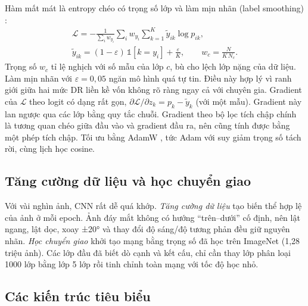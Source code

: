Hàm mất mát là entropy chéo có trọng số lớp và làm mịn nhãn (label smoothing) \cite{szegedy2016}:
\begin{equation}
\begin{gathered}
\mathcal L = -\frac{1}{\sum_i w_{y_i}}\sum_{i} w_{y_i}\sum_{k=1}^{K} \tilde y_{ik}\log p_{ik}, \\
\tilde y_{ik} = (1-\varepsilon)\,\mathbb 1[k=y_i] + \frac{\varepsilon}{K},\qquad w_c = \frac{N}{K\,N_c}.
\end{gathered}
\label{eq:ce}
\end{equation}
Trọng số $w_c$ tỉ lệ nghịch với số mẫu của lớp $c$, bù cho lệch lớp nặng của dữ liệu. Làm mịn nhãn với $\varepsilon=0{,}05$ ngăn mô hình quá tự tin. Điều này hợp lý vì ranh giới giữa hai mức DR liền kề vốn không rõ ràng ngay cả với chuyên gia. Gradient của $\mathcal L$ theo logit có dạng rất gọn, $\partial\mathcal L/\partial z_k = p_k - \tilde y_k$ (với một mẫu). Gradient này lan ngược qua các lớp bằng quy tắc chuỗi. Gradient theo bộ lọc tích chập chính là tương quan chéo giữa đầu vào và gradient đầu ra, nên cũng tính được bằng một phép tích chập. Tối ưu bằng AdamW \cite{loshchilov2019}, tức Adam với suy giảm trọng số tách rời, cùng lịch học cosine.

\subsection{Tăng cường dữ liệu và học chuyển giao}

Với vài nghìn ảnh, CNN rất dễ quá khớp. \emph{Tăng cường dữ liệu} tạo biến thể hợp lệ của ảnh ở mỗi epoch. Ảnh đáy mắt không có hướng ``trên–dưới'' cố định, nên lật ngang, lật dọc, xoay ±20° và thay đổi độ sáng/độ tương phản đều giữ nguyên nhãn. \emph{Học chuyển giao} khởi tạo mạng bằng trọng số đã học trên ImageNet \cite{deng2009} (1,28 triệu ảnh). Các lớp đầu đã biết dò cạnh và kết cấu, chỉ cần thay lớp phân loại 1000 lớp bằng lớp 5 lớp rồi tinh chỉnh toàn mạng với tốc độ học nhỏ.

\subsection{Các kiến trúc tiêu biểu}

